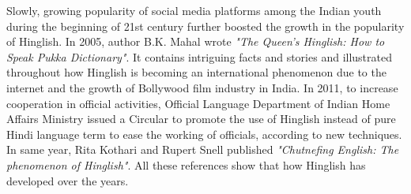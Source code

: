 \documentclass{article}
\begin{document}
Slowly, growing popularity of social media platforms among the Indian youth during the beginning of 21st century further boosted the growth in the popularity of Hinglish. In 2005, author B.K. Mahal wrote \textit{"The Queen's Hinglish: How to Speak Pukka Dictionary"}. It contains intriguing facts and stories and illustrated throughout how Hinglish is becoming an international phenomenon due to the internet and the growth of Bollywood film industry in India. In 2011, to increase cooperation in official activities, Official Language Department of Indian Home Affairs Ministry issued a Circular to promote the use of Hinglish instead of pure Hindi language term to ease the working of officials, according to new techniques. In same year, Rita Kothari and Rupert Snell published \textit{"Chutnefing English: The phenomenon of Hinglish"}. All these references show that how Hinglish has developed over the years.
\end{document}
